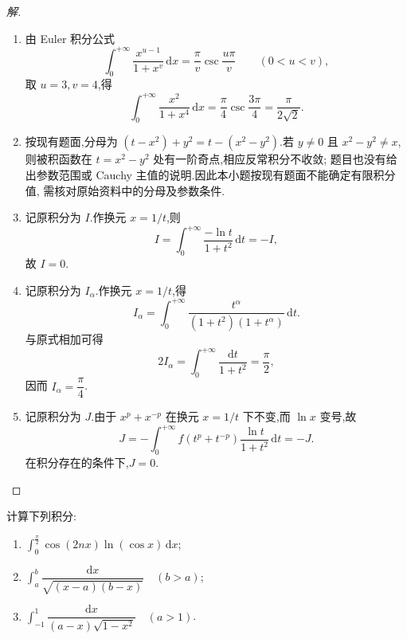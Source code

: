 \documentclass[../../数学分析培优讲义(答案版).tex]{subfiles}
\begin{document}
\begin{proof}[解]
\begin{enumerate}[label=(\arabic*)]
    \item 由 Euler 积分公式
    \[
        \int_0^{+\infty}\dfrac{x^{u-1}}{1+x^v}\,\mathrm{d}x
        =\dfrac{\pi}{v}\csc\dfrac{u\pi}{v}
        \qquad(0<u<v),
    \]
    取 $u=3,v=4$,得
    \[
        \int_0^{+\infty}\dfrac{x^2}{1+x^4}\,\mathrm{d}x
        =\dfrac{\pi}{4}\csc\dfrac{3\pi}{4}
        =\dfrac{\pi}{2\sqrt{2}}.
    \]

    \item 按现有题面,分母为 $(t-x^2)+y^2=t-(x^2-y^2)$.若 $y\neq0$ 且
    $x^2-y^2\neq x$,则被积函数在 $t=x^2-y^2$ 处有一阶奇点,相应反常积分不收敛;
    题目也没有给出参数范围或 Cauchy 主值的说明.因此本小题按现有题面不能确定有限积分值,
    需核对原始资料中的分母及参数条件.

    \item 记原积分为 $I$.作换元 $x=1/t$,则
    \[
        I=\int_0^{+\infty}\dfrac{-\ln t}{1+t^2}\,\mathrm{d}t=-I,
    \]
    故 $I=0$.

    \item 记原积分为 $I_\alpha$.作换元 $x=1/t$,得
    \[
        I_\alpha
        =\int_0^{+\infty}\dfrac{t^\alpha}{(1+t^2)(1+t^\alpha)}\,\mathrm{d}t.
    \]
    与原式相加可得
    \[
        2I_\alpha=\int_0^{+\infty}\dfrac{\mathrm{d}t}{1+t^2}=\dfrac{\pi}{2},
    \]
    因而 $I_\alpha=\dfrac{\pi}{4}$.

    \item 记原积分为 $J$.由于 $x^p+x^{-p}$ 在换元 $x=1/t$ 下不变,而
    $\ln x$ 变号,故
    \[
        J=-\int_0^{+\infty}f(t^p+t^{-p})\dfrac{\ln t}{1+t^2}\,\mathrm{d}t=-J.
    \]
    在积分存在的条件下,$J=0$.
\end{enumerate}
\end{proof}

\begin{example}
计算下列积分:
\begin{enumerate}[label=(\arabic*)]
    \item $\displaystyle\int_0^{\frac{\pi}{2}}\cos(2nx)\ln(\cos x)\,\mathrm{d}x$;
    \item $\displaystyle\int_a^b\dfrac{\mathrm{d}x}{\sqrt{(x-a)(b-x)}}\quad(b>a)$;
    \item $\displaystyle\int_{-1}^{1}\dfrac{\mathrm{d}x}{(a-x)\sqrt{1-x^2}}\quad(a>1)$.
\end{enumerate}
\end{example}
\end{document}
